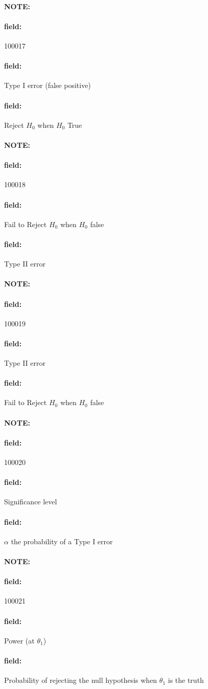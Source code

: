 \documentclass[12pt]{article}
\newenvironment{note}{\paragraph{NOTE:}}{}
\newenvironment{field}{\paragraph{field:}}{}
\begin{document}
\begin{note} \begin{field} \tiny 100017 \end{field}
 \begin{field}
  Type I error (false positive)
 \end{field}
 \begin{field}
  Reject $H_0$ when $H_0$ True
 \end{field}
\end{note}

\begin{note} \begin{field} \tiny 100018 \end{field}
 \begin{field}
  Fail to Reject $H_0$ when $H_0$ false
 \end{field}
 \begin{field}
  Type II error
 \end{field}
\end{note}

\begin{note} \begin{field} \tiny 100019 \end{field}
 \begin{field}
  Type II error
 \end{field}
 \begin{field}
  Fail to Reject $H_0$ when $H_0$ false
 \end{field}
\end{note}

\begin{note} \begin{field} \tiny 100020 \end{field}
 \begin{field}
  Significance level
 \end{field}
 \begin{field}
  $\alpha$ the probability of a Type I error
 \end{field}
\end{note}

\begin{note} \begin{field} \tiny 100021 \end{field}
 \begin{field}
  Power (at $\theta_1$)
 \end{field}
 \begin{field}
  Probability of rejecting the null hypothesis when $\theta_1$ is the truth
 \end{field}
\end{note}
\end{document}
